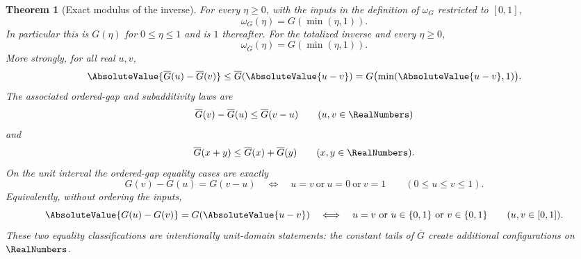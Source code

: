 \documentclass[11pt,oneside]{article}
\newtheorem{theorem}{Theorem}[section]
\theoremstyle{definition}
\theoremstyle{remark}
\numberwithin{equation}{section}
\newcommand{\InvT}{\overline G}
\begin{document}
\begin{theorem}[Exact modulus of the inverse]\label{thm:exact-inverse-modulus}
For every $\eta\ge0$, with the inputs in the definition of $\omega_G$
restricted to $[0,1]$,
\begin{equation}\label{eq:exact-inverse-modulus}
 \omega_G(\eta)=G(\min(\eta,1)).
\end{equation}
In particular this is $G(\eta)$ for $0\le\eta\le1$ and is $1$ thereafter.
For the totalized inverse and every $\eta\ge0$,
\begin{equation}\label{eq:exact-total-modulus}
 \omega_{\InvT}(\eta)=G(\min(\eta,1)).
\end{equation}
More strongly, for all real $u,v$,
\begin{equation}\label{eq:absolute-inverse-gap-bound}
 \AbsoluteValue{\InvT(u)-\InvT(v)}
 \le \InvT(\AbsoluteValue{u-v})
 =G\bigl(\min(\AbsoluteValue{u-v},1)\bigr).
\end{equation}
The associated ordered-gap and subadditivity laws are
\begin{equation}\label{eq:inverse-gap-bound}
 \InvT(v)-\InvT(u)\le \InvT(v-u)
 \qquad(u,v\in\RealNumbers)
\end{equation}
and
\begin{equation}\label{eq:inverse-subadditive}
 \InvT(x+y)\le\InvT(x)+\InvT(y)
 \qquad(x,y\in\RealNumbers).
\end{equation}
On the unit interval the ordered-gap equality cases are exactly
\begin{equation}\label{eq:inverse-gap-equality}
 G(v)-G(u)=G(v-u)
 \quad\Longleftrightarrow\quad
 u=v\ \text{or}\ u=0\ \text{or}\ v=1
 \qquad(0\le u\le v\le1).
\end{equation}
Equivalently, without ordering the inputs,
\begin{equation}\label{eq:absolute-inverse-gap-equality}
 \AbsoluteValue{G(u)-G(v)}=G(\AbsoluteValue{u-v})
 \quad\Longleftrightarrow\quad
 u=v\ \text{or}\ u\in\{0,1\}\ \text{or}\ v\in\{0,1\}
 \qquad(u,v\in[0,1]).
\end{equation}
These two equality classifications are intentionally unit-domain statements:
the constant tails of $\InvT$ create additional configurations on $\RealNumbers$.
\end{theorem}
\end{document}
